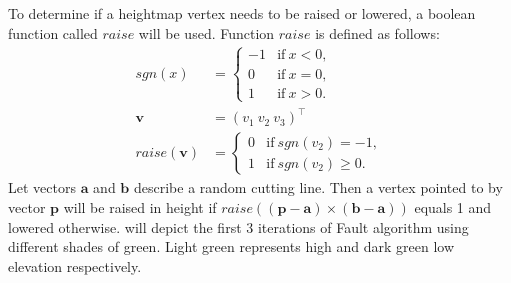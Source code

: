 \documentclass[11pt,a4paper,twoside,openright]{report}
\begin{document}
To determine if a heightmap vertex needs to be raised or lowered, a boolean function called $raise$ will be used. Function $raise$ is defined as follows:
\begin{align*}
sgn(x) &=
\begin{cases}
  -1 & \text{if}\ x < 0, \\
  0 & \text{if}\ x = 0, \\
  1 & \text{if}\ x > 0.
\end{cases} \\
\mathbf{v} &= (v_1\ v_2\ v_3)^\intercal \\
raise(\mathbf{v}) &=
\begin{cases}
  0 & \text{if}\ sgn(v_2) = -1, \\
  1 & \text{if}\ sgn(v_2) \geq 0.
\end{cases}
\end{align*}
Let vectors $\mathbf{a}$ and $\mathbf{b}$ describe a random cutting line. Then a vertex pointed to by vector $\mathbf{p}$ will be raised in height if $raise((\mathbf{p}-\mathbf{a}) \times (\mathbf{b} - \mathbf{a}))$ equals 1 and lowered otherwise.  will depict the first 3 iterations of Fault algorithm using different shades of green. Light green represents high and dark green low elevation respectively.
\end{document}
